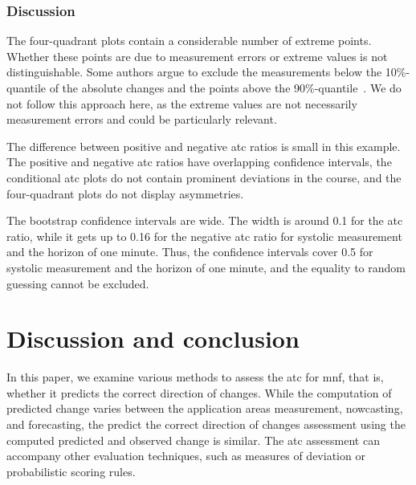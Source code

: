 \documentclass[pdflatex]{sn-jnl}
\theoremstyle{plain}%
\theoremstyle{definition}
\begin{document}
\subsubsection*{Discussion}

The four-quadrant plots contain a considerable number of extreme points.
Whether these points are due to measurement errors or extreme values is not distinguishable.
Some authors argue to exclude the measurements below the 10\%-quantile of the absolute changes and the points above the 90\%-quantile~\citep[see][]{Critchley2010}.
We do not follow this approach here, as the extreme values are not necessarily measurement errors and could be particularly relevant.

The difference between positive and negative \ac{atc} ratios is small in this example.
The positive and negative \ac{atc} ratios have overlapping confidence intervals, the conditional \ac{atc} plots do not contain prominent deviations in the course, and the four-quadrant plots do not display asymmetries.

The bootstrap confidence intervals are wide.
The width is around 0.1 for the \ac{atc} ratio, while it gets up to 0.16 for the negative \ac{atc} ratio for systolic measurement and the horizon of one minute.
Thus, the confidence intervals cover 0.5 for systolic measurement and the horizon of one minute, and the equality to random guessing cannot be excluded.



\section{Discussion and conclusion}\label{sec:atc-conclusion}

In this paper, we examine various methods to assess the \acf{atc} for \acf{mnf}, that is, whether it predicts the correct direction of changes.
While the computation of predicted change varies between the application areas measurement, nowcasting, and forecasting, the predict the correct direction of changes assessment using the computed predicted and observed change is similar.
The \ac{atc} assessment can accompany other evaluation techniques, such as measures of deviation or probabilistic scoring rules.
\end{document}
